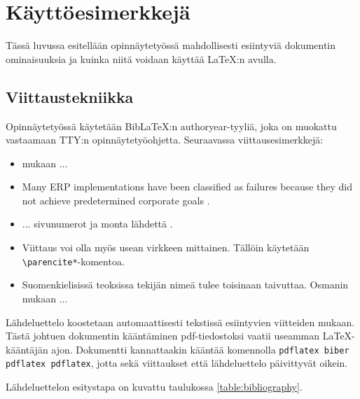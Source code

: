 \chapter{Käyttöesimerkkejä}

Tässä luvussa esitellään opinnäytetyössä mahdollisesti esiintyviä dokumentin ominaisuuksia ja kuinka niitä voidaan käyttää \LaTeX:n avulla. 

\section{Viittaustekniikka}

Opinnäytetyössä käytetään BibLaTeX:n authoryear-tyyliä, joka on muokattu vastaamaan TTY:n opinnäytetyöohjetta. Seuraavassa viittausesimerkkejä:

\begin{itemize}
	\item \textcite[ss.~32--34]{lehman2014biblatex} mukaan ...
	\item Many ERP implementations have been classified as failures because they did not achieve predetermined corporate goals \cite{umble2003enterprise}.
	\item ... sivunumerot ja monta lähdettä \cites[189]{osmani2013}[1]{knuth1973fundamental}.
	\item Viittaus voi olla myös usean virkkeen mittainen. Tällöin käytetään \verb+\parencite*+-komentoa. \cite*{somers2001impact}
	\item Suomenkielisissä teoksissa tekijän nimeä tulee toisinaan taivuttaa. Osmanin \citeyear[12]{osmani2013} mukaan ...
\end{itemize}

Lähdeluettelo koostetaan automaattisesti tekstissä esiintyvien viitteiden mukaan.
Tästä johtuen dokumentin kääntäminen pdf-tiedostoksi vaatii useamman \LaTeX-kääntäjän ajon.
Dokumentti kannattaakin kääntää komennolla \texttt{pdflatex biber pdflatex pdflatex}, jotta sekä viittaukset että lähdeluettelo päivittyvät oikein.

Lähdeluettelon esitystapa on kuvattu taulukossa \ref{table:bibliography}.

